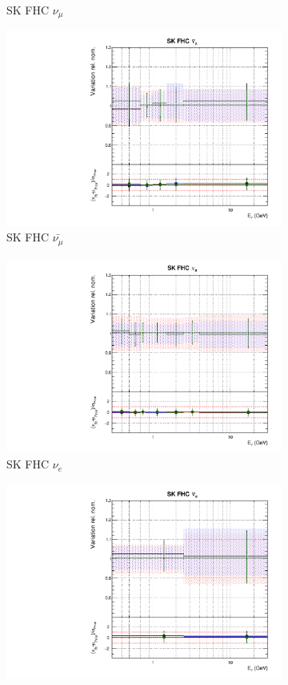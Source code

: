 \begin{figure}[t]
\begin{subfigure}{0.45\textwidth}
  \caption{SK FHC $\nu_{\mu}$}
\end{subfigure}
\begin{subfigure}{0.45\textwidth}
  \centering
  \includegraphics[width=0.75\linewidth]{figs/hptpcfitsflux_9}
  \caption{SK FHC $\bar{\nu_{\mu}}$}
\end{subfigure}
\begin{subfigure}{0.45\textwidth}
  \centering
  \includegraphics[width=0.75\linewidth]{figs/hptpcfitsflux_10}
  \caption{SK FHC $\nu_e$}
\end{subfigure}
\begin{subfigure}{0.45\textwidth}
  \centering
  \includegraphics[width=0.75\linewidth]{figs/hptpcfitsflux_11}

\end{subfigure}
\end{figure}
